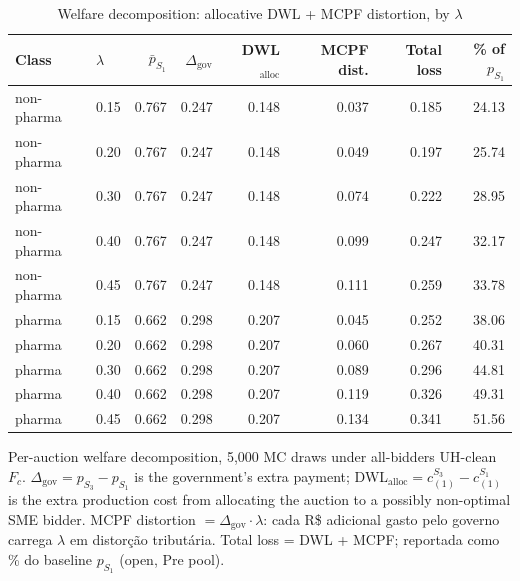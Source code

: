 \begin{table}[htbp]
\centering
\begin{threeparttable}
\caption{Welfare decomposition: allocative DWL + MCPF distortion, by $\lambda$}
\label{tab:v3_welfare}
\small
\begin{tabular}{llrrrrrr}
\toprule
Class & $\lambda$ & $\bar p_{S_1}$ & $\Delta_{\text{gov}}$ & DWL$_{\text{alloc}}$ & MCPF dist. & Total loss & \% of $p_{S_1}$ \\
\midrule
non-pharma & 0.15 & 0.767 & 0.247 & 0.148 & 0.037 & 0.185 & 24.13 \\
non-pharma & 0.20 & 0.767 & 0.247 & 0.148 & 0.049 & 0.197 & 25.74 \\
non-pharma & 0.30 & 0.767 & 0.247 & 0.148 & 0.074 & 0.222 & 28.95 \\
non-pharma & 0.40 & 0.767 & 0.247 & 0.148 & 0.099 & 0.247 & 32.17 \\
non-pharma & 0.45 & 0.767 & 0.247 & 0.148 & 0.111 & 0.259 & 33.78 \\
pharma & 0.15 & 0.662 & 0.298 & 0.207 & 0.045 & 0.252 & 38.06 \\
pharma & 0.20 & 0.662 & 0.298 & 0.207 & 0.060 & 0.267 & 40.31 \\
pharma & 0.30 & 0.662 & 0.298 & 0.207 & 0.089 & 0.296 & 44.81 \\
pharma & 0.40 & 0.662 & 0.298 & 0.207 & 0.119 & 0.326 & 49.31 \\
pharma & 0.45 & 0.662 & 0.298 & 0.207 & 0.134 & 0.341 & 51.56 \\
\bottomrule
\end{tabular}
\begin{tablenotes}\footnotesize
\item Per-auction welfare decomposition, 5{,}000 MC draws under
all-bidders UH-clean $F_c$. $\Delta_{\text{gov}} = p_{S_3} -
p_{S_1}$ is the government's extra payment; DWL$_{\text{alloc}}
= c_{(1)}^{S_3} - c_{(1)}^{S_1}$ is the extra production cost
from allocating the auction to a possibly non-optimal SME bidder.
MCPF distortion $= \Delta_{\text{gov}} \cdot \lambda$: cada R\$
adicional gasto pelo governo carrega $\lambda$ em distor\c{c}\~ao
tribut\'aria. Total loss = DWL + MCPF; reportada como \% do
baseline $p_{S_1}$ (open, Pre pool).
\end{tablenotes}
\end{threeparttable}
\end{table}
